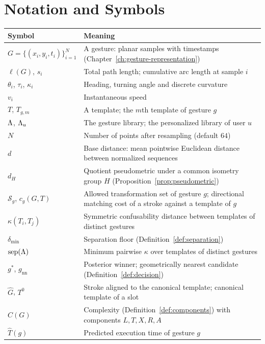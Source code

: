 \chapter{Notation and Symbols}\label{app:notation}

\begin{table}[h]
\centering
\small
\begin{tabularx}{\textwidth}{@{}lX@{}}
\toprule
Symbol & Meaning \\
\midrule
$G=\{(x_i,y_i,t_i)\}_{i=1}^{N}$ & A gesture: planar samples with timestamps (Chapter~\ref{ch:gesture-representation}) \\
$\ell(G)$, $s_i$ & Total path length; cumulative arc length at sample $i$ \\
$\theta_i$, $\tau_i$, $\kappa_i$ & Heading, turning angle and discrete curvature \\
$v_i$ & Instantaneous speed \\
$T$, $T_{g,m}$ & A template; the $m$th template of gesture $g$ \\
$\Lambda$, $\Lambda_u$ & The gesture library; the personalized library of user $u$ \\
$N$ & Number of points after resampling (default $64$) \\
$d$ & Base distance: mean pointwise Euclidean distance between normalized sequences \\
$d_H$ & Quotient pseudometric under a common isometry group $H$ (Proposition~\ref{prop:pseudometric}) \\
$\mathcal S_g$, $c_g(G,T)$ & Allowed transformation set of gesture $g$; directional matching cost of a stroke against a template of $g$ \\
$\kappa(T_i,T_j)$ & Symmetric confusability distance between templates of distinct gestures \\
$\delta_{\min}$ & Separation floor (Definition~\ref{def:separation}) \\
$\operatorname{sep}(\Lambda)$ & Minimum pairwise $\kappa$ over templates of distinct gestures \\
$g^{\ast}$, $g_{\mathrm{nn}}$ & Posterior winner; geometrically nearest candidate (Definition~\ref{def:decision}) \\
$\hat G$, $T^0$ & Stroke aligned to the canonical template; canonical template of a slot \\
$C(G)$ & Complexity (Definition~\ref{def:components}) with components $L,T,X,R,A$ \\
$\hat T(g)$ & Predicted execution time of gesture $g$ \\

\end{tabularx}
\end{table}

